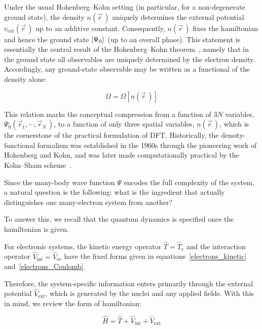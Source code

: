 Under the usual Hohenberg--Kohn setting (in particular, for a non-degenerate ground state), the density $n(\vec{r}\,)$ uniquely determines the external potential $v_\mathrm{ext}(\vec{r}\,)$ up to an additive constant.
Consequently, $n(\vec{r}\,)$ fixes the hamiltonian and hence the ground state $\ket{\Psi_0}$ (up to an overall phase).
This statement is essentially the central result of the Hohenberg--Kohn theorem~\cite{hohenberg1964inhomogeneous}, namely that in the ground state all observables are uniquely determined by the electron density.
Accordingly, any ground-state observable may be written as a functional of the density alone:

\begin{equation}
    \Omega = \Omega[n(\vec{r}\,)]
\label{ground_state_observable_density_functional}
\end{equation}

This relation marks the conceptual compression from a function of $3N$ variables, $\Psi_0(\vec{r}_1,\cdots,\vec{r}_N\,)$, to a function of only three spatial variables, $n(\vec{r}\,)$, which is the cornerstone of the practical formulation of DFT.
Historically, the density-functional formalism was established in the 1960s through the pioneering work of Hohenberg and Kohn, and was later made computationally practical by the Kohn--Sham scheme~\cite{kohn1965self}.

Since the many-body wave function $\Psi$ encodes the full complexity of the system, a natural question is the following: what is the ingredient that actually distinguishes one many-electron system from another?

To answer this, we recall that the quantum dynamics is specified once the hamiltonian is given.

For electronic systems, the kinetic energy operator $\hat{T}=\hat{T}_\mathrm{e}$ and the interaction operator $\hat{V}_\mathrm{int}=\hat{V}_\mathrm{ee}$ have the fixed forms given in equations~\eqref{electrons_kinetic} and~\eqref{electrons_Coulomb}.

Therefore, the system-specific information enters primarily through the external potential $\hat{V}_\mathrm{ext}$, which is generated by the nuclei and any applied fields.
With this in mind, we review the form of hamiltonian:

\begin{equation}
    \hat{H}=\hat{T}+\hat{V}_\mathrm{int}+\hat{V}_\mathrm{ext}
\label{hamiltonian_decomposition}
\end{equation}


